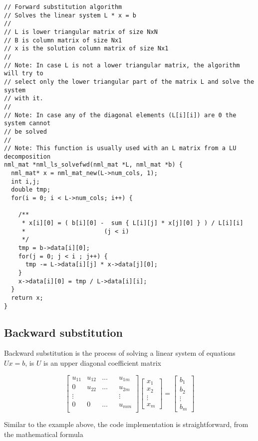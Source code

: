 \begin{verbatim}
// Forward substitution algorithm
// Solves the linear system L * x = b
//
// L is lower triangular matrix of size NxN
// B is column matrix of size Nx1
// x is the solution column matrix of size Nx1
//
// Note: In case L is not a lower triangular matrix, the algorithm will try to
// select only the lower triangular part of the matrix L and solve the system
// with it.
//
// Note: In case any of the diagonal elements (L[i][i]) are 0 the system cannot
// be solved
//
// Note: This function is usually used with an L matrix from a LU decomposition
nml_mat *nml_ls_solvefwd(nml_mat *L, nml_mat *b) {
  nml_mat* x = nml_mat_new(L->num_cols, 1);
  int i,j;
  double tmp;
  for(i = 0; i < L->num_cols; i++) {
  
    /**
     * x[i][0] = ( b[i][0] -  sum { L[i][j] * x[j][0] } ) / L[i][i]
     *                      (j < i)
     */
    tmp = b->data[i][0];
    for(j = 0; j < i ; j++) {
      tmp -= L->data[i][j] * x->data[j][0];
    }
    x->data[i][0] = tmp / L->data[i][i];
  }
  return x;
}
\end{verbatim}

\subsection{Backward substitution}

Backward substitution is the process of solving a linear system of equations $Ux = b$, is $U$ is an upper diagonal coefficient matrix

$$
\begin{bmatrix}
u_{11} & u_{12} & \ldots && u_{1m} \\
0 & u_{22} & \ldots && u_{2m} \\
\vdots & & & & \vdots \\
0 & 0 & \ldots && u_{mm} \\
\end{bmatrix}
\begin{bmatrix}
x_{1} \\
x_{2} \\
\vdots   \\
x_{m}
\end{bmatrix}
=
\begin{bmatrix}
b_{1} \\
b_{2} \\
\vdots \\
b_{m}
\end{bmatrix}
$$

Similar to the example above, the code implementation is straightforward, from the mathematical formula

